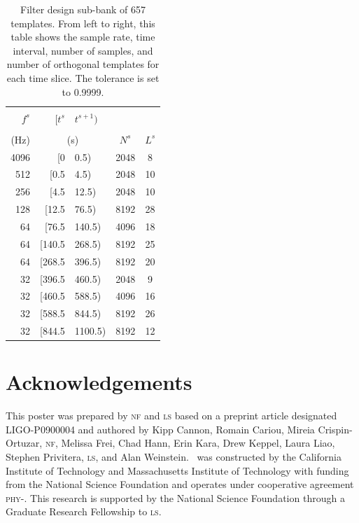 \documentclass[portrait,plainboxedsections]{sciposter}
\begin{document}
\begin{minipage}[t]{0.25\textwidth}
\begin{table}
\centering
\begin{tabular}{rr@{,\,}lcc}
\toprule
\\ [-2ex]
$f^s$ & $[t^s$&$t^{s+1})$ & & \\%
\\[-2.5ex]
(Hz) & \multicolumn{2}{c}{(s)} & $N^s$ & $L^s$ \\ \midrule
4096 & [0&0.5) & 2048 & 8 \\
512 & [0.5&4.5) & 2048 & 10 \\
256 & [4.5&12.5) & 2048 & 10 \\
128 & [12.5&76.5) & 8192 & 28 \\
64 & [76.5&140.5) & 4096 & 18 \\
64 & [140.5&268.5) & 8192 & 25 \\
64 & [268.5&396.5) & 8192 & 20 \\
32 & [396.5&460.5) & 2048 & 9 \\
32 & [460.5&588.5) & 4096 & 16 \\
32 & [588.5&844.5) & 8192 & 26 \\
32 & [844.5&1100.5) & 8192 & 12 \\
\bottomrule
\end{tabular}
\caption{\label{tab:time_slices} Filter design sub-bank of 657 templates.  From left to right, this table shows the sample rate, time interval, number of samples, and number of orthogonal templates for each time slice.  The \SVD{} tolerance is set to 0.9999.}
\end{table}

\end{minipage}

\section*{Acknowledgements}

This poster was prepared by \textsc{nf} and \textsc{ls} based on a preprint
article designated LIGO-P0900004 and authored by Kipp Cannon, Romain Cariou,
Mireia Crispin-Ortuzar, \textsc{nf}, Melissa Frei, Chad Hann, Erin Kara, Drew
Keppel, Laura Liao, Stephen Privitera, \textsc{ls}, and Alan Weinstein. \LIGO\
was constructed by the California Institute of Technology and Massachusetts
Institute of Technology with funding from the National Science Foundation and
operates under cooperative agreement \textsc{phy}-\oldstylenums{0107417}. This
research is supported by the National Science Foundation through a Graduate
Research Fellowship to \textsc{ls}.




\end{document}
